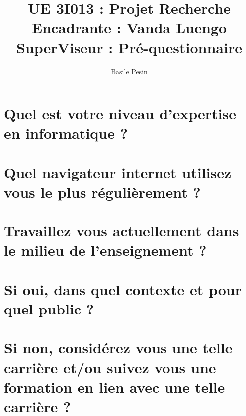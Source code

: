 \documentclass{exam}
\title{UE 3I013 : Projet Recherche\\
    Encadrante : Vanda Luengo\\
    SuperViseur : Pré-questionnaire}
\author{Basile Pesin}
\begin{document}
\maketitle

\noindent
{}
\vspace{0.2in}
\vspace{0.1in}

\begin{questions}

    \question
    \begin{parts}
        \part{Quel est votre niveau d'expertise en informatique ?} \fillwithlines{0.3in}
        \part{Quel navigateur internet utilisez vous le plus régulièrement ?} \fillwithlines{0.3in}
    \end{parts}

    \question
    \begin{parts}
        \part{Travaillez vous actuellement dans le milieu de l'enseignement ?} \fillwithlines{0.3in}
        \part{Si oui, dans quel contexte et pour quel public ?} \fillwithlines{0.3in}
        \part{Si non, considérez vous une telle carrière et/ou suivez vous une formation en lien avec une telle carrière ?} \fillwithlines{0.3in}
    \end{parts}

     \fillwithlines{0.3in}

     \fillwithlines{1in}
\end{questions}
\end{document}
